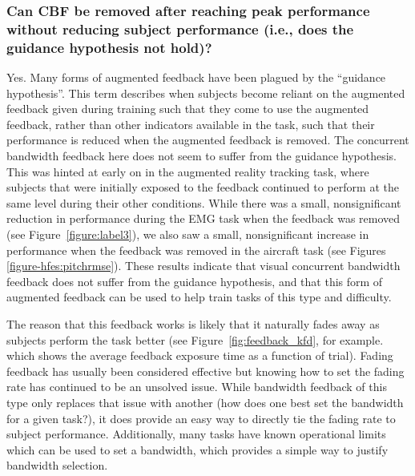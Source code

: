 \subsubsection{Can CBF be removed after reaching peak performance without reducing subject performance (i.e., does the guidance hypothesis not hold)?}
Yes.
Many forms of augmented feedback have been plagued by the ``guidance hypothesis''.
This term describes when subjects become reliant on the augmented feedback given during training such that they come to use the augmented feedback, rather than other indicators available in the task, such that their performance is reduced when the augmented feedback is removed.
The concurrent bandwidth feedback here does not seem to suffer from the guidance hypothesis.
This was hinted at early on in the augmented reality tracking task, where subjects that were initially exposed to the feedback continued to perform at the same level during their other conditions.
While there was a small, nonsignificant reduction in performance during the EMG task when the feedback was removed (see Figure~\ref{figure:label3}), we also saw a small, nonsignificant increase in performance when the feedback was removed in the aircraft task (see Figures \ref{figure-hfes:pitchrmse}).
These results indicate that visual concurrent bandwidth feedback does not suffer from the guidance hypothesis, and that this form of augmented feedback can be used to help train tasks of this type and difficulty.

The reason that this feedback works is likely that it naturally fades away as subjects perform the task better (see Figure~\ref{fig:feedback_kfd}, for example. which shows the average feedback exposure time as a function of trial).
Fading feedback has usually been considered effective but knowing how to set the fading rate has continued to be an unsolved issue.
While bandwidth feedback of this type only replaces that issue with another (how does one best set the bandwidth for a given task?), it does provide an easy way to directly tie the fading rate to subject performance.
Additionally, many tasks have known operational limits which can be used to set a bandwidth, which provides a simple way to justify bandwidth selection.

